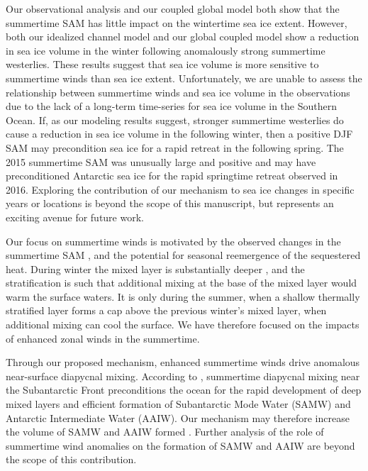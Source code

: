 \documentclass{ametsocV5}
\begin{document}


Our observational analysis and our coupled global model both show that the summertime SAM has  little impact on the wintertime sea ice extent. However, both our idealized channel model and our global coupled model show a reduction in sea ice volume in the winter following anomalously strong summertime westerlies. These results suggest that sea ice volume is more sensitive to summertime winds than sea ice extent. Unfortunately, we are unable to assess the relationship between summertime winds and sea ice volume in the observations due to the lack of a long-term time-series for sea ice volume in the Southern Ocean. If, as our modeling results suggest, stronger summertime westerlies do cause a reduction in sea ice volume in the following winter, then a positive DJF SAM may precondition sea ice for a rapid retreat in the following spring. The 2015 summertime SAM was unusually large and positive and may have preconditioned Antarctic sea ice for the rapid springtime retreat observed in 2016. Exploring the contribution of our mechanism to sea ice changes in specific years or locations is beyond the scope of this manuscript, but represents an exciting avenue for future work.

Our focus on summertime winds is motivated by the observed changes in the summertime SAM \citep{Marshall2003a}, and the potential for seasonal reemergence of the sequestered heat. During winter the mixed layer is substantially deeper \citep{Holte2017}, and the stratification is such that additional mixing at the base of the mixed layer would warm the surface waters. It is only during the summer, when a shallow thermally stratified layer forms a cap above the previous winter's mixed layer, when additional mixing can cool the surface. We have therefore focused on the impacts of enhanced zonal winds in the summertime.

Through our proposed mechanism, enhanced summertime winds drive anomalous near-surface diapycnal mixing. According to \citet{Sloyan2010}, summertime diapycnal mixing near the Subantarctic Front preconditions the ocean for the rapid development of deep mixed layers and efficient formation of Subantarctic Mode Water (SAMW) and Antarctic Intermediate Water (AAIW). Our mechanism may therefore increase the volume of SAMW and AAIW formed \citep[c.f.][]{Gao2018}. Further analysis of the role of summertime wind anomalies on the formation of SAMW and AAIW are beyond the scope of this contribution.
\end{document}
